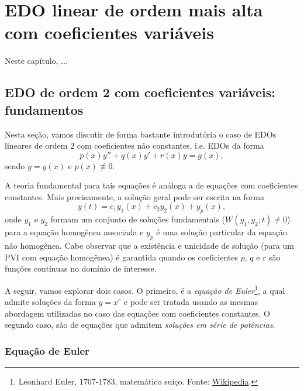 
\chapter{EDO linear de ordem mais alta com coeficientes variáveis}\label{cap_edolcv}
\thispagestyle{fancy}

Neste capítulo, ...

\section{EDO de ordem 2 com coeficientes variáveis: fundamentos}\label{cap_edolcv_sec_edo2lcvfun}

Nesta seção, vamos discutir de forma bastante introdutória o caso de EDOs lineares de ordem 2 com coeficientes não constantes, i.e. EDOs da forma
\begin{equation}
  p(x)y'' + q(x)y' + r(x)y = g(x),
\end{equation}
sendo $y = y(x)$ e $p(x)\not\equiv 0$.

A teoria fundamental para tais equações é análoga a de equações com coeficientes constantes. Mais precisamente, a solução geral pode ser escrita na forma
\begin{equation}
  y(t) = c_1y_1(x) + c_2y_2(x) + y_p(x),
\end{equation}
onde $y_1$ e $y_2$ formam um conjunto de soluções fundamentais ($W(y_1,y_2;t)\neq 0$) para a equação homogênea associada e $y_p$ é uma solução particular da equação não homogênea. Cabe observar que a existência e unicidade de solução (para um PVI com equação homogênea) é garantida quando os coeficientes $p$, $q$ e $r$ são funções contínuas no domínio de interesse.

A seguir, vamos explorar dois casos. O primeiro, é a \emph{equação de Euler}\footnote{Leonhard Euler, 1707-1783, matemático suíço. Fonte: \href{https://en.wikipedia.org/wiki/Leonhard_Euler}{Wikipedia}.}, a qual admite soluções da forma $y = x^r$ e pode ser tratada usando as mesmas abordagem utilizadas no caso das equações com coeficientes constantes. O segundo caso, são de equações que admitem \emph{soluções em série de potências}.

\subsection{Equação de Euler}


